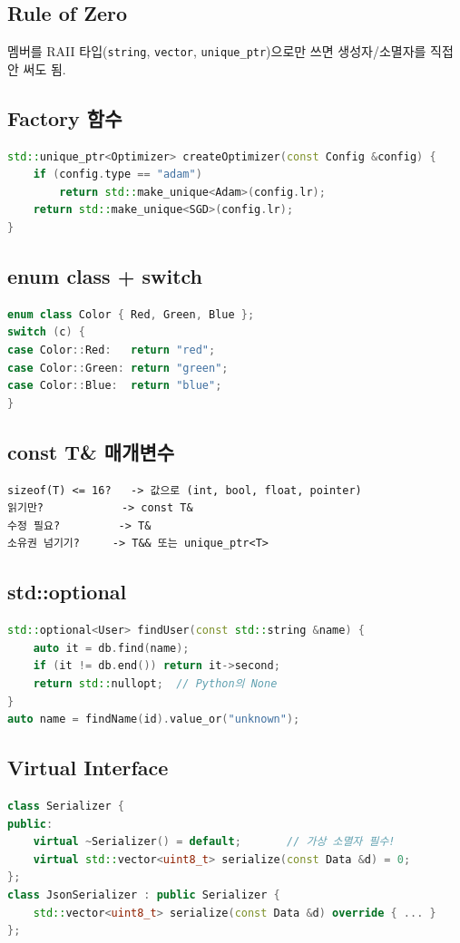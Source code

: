 \documentclass[11pt,a4paper]{article}
\begin{document}
\subsection{Rule of Zero}
멤버를 RAII 타입(\texttt{string}, \texttt{vector}, \texttt{unique\_ptr})으로만 쓰면 생성자/소멸자를 직접 안 써도 됨.

\subsection{Factory 함수}
\begin{lstlisting}[language=C++]
std::unique_ptr<Optimizer> createOptimizer(const Config &config) {
    if (config.type == "adam")
        return std::make_unique<Adam>(config.lr);
    return std::make_unique<SGD>(config.lr);
}
\end{lstlisting}

\subsection{enum class + switch}
\begin{lstlisting}[language=C++]
enum class Color { Red, Green, Blue };
switch (c) {
case Color::Red:   return "red";
case Color::Green: return "green";
case Color::Blue:  return "blue";
}
\end{lstlisting}

\subsection{const T\& 매개변수}
\begin{lstlisting}
sizeof(T) <= 16?   -> 값으로 (int, bool, float, pointer)
읽기만?            -> const T&
수정 필요?         -> T&
소유권 넘기기?     -> T&& 또는 unique_ptr<T>
\end{lstlisting}

\subsection{std::optional}
\begin{lstlisting}[language=C++]
std::optional<User> findUser(const std::string &name) {
    auto it = db.find(name);
    if (it != db.end()) return it->second;
    return std::nullopt;  // Python의 None
}
auto name = findName(id).value_or("unknown");
\end{lstlisting}

\subsection{Virtual Interface}
\begin{lstlisting}[language=C++]
class Serializer {
public:
    virtual ~Serializer() = default;       // 가상 소멸자 필수!
    virtual std::vector<uint8_t> serialize(const Data &d) = 0;
};
class JsonSerializer : public Serializer {
    std::vector<uint8_t> serialize(const Data &d) override { ... }
};
\end{lstlisting}
\end{document}
